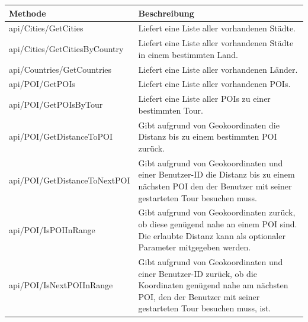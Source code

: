 \documentclass[a4paper,10pt,xetex]{article}
\begin{document}
\begin{longtabu} to \textwidth { | l | X[l] | }
\hline
\textbf{Methode} & \textbf{Beschreibung} \\
\hline
\endhead

api/Cities/GetCities &
Liefert eine Liste aller vorhandenen St\"adte.\\\hline
api/Cities/GetCitiesByCountry &
Liefert eine Liste aller vorhandenen St\"adte in einem bestimmten Land.\\\hline
  api/Countries/GetCountries &
Liefert eine Liste aller vorhandenen L\"ander.\\\hline
api/POI/GetPOIs &
Liefert eine Liste aller vorhandenen POIs.\\\hline
api/POI/GetPOIsByTour &
Liefert eine Liste aller POIs zu einer bestimmten Tour.\\\hline
api/POI/GetDistanceToPOI &
Gibt aufgrund von Geokoordinaten die Distanz bis zu einem bestimmten POI zur\"uck.\\\hline
api/POI/GetDistanceToNextPOI &
Gibt aufgrund von Geokoordinaten und einer Benutzer-ID die Distanz bis zu einem n\"achsten POI
  den der Benutzer mit seiner gestarteten Tour besuchen muss.\\\hline
api/POI/IsPOIInRange &
Gibt aufgrund von Geokoordinaten zur\"uck, ob diese gen\"ugend nahe an einem POI sind. Die
  erlaubte Distanz kann als optionaler Parameter mitgegeben werden. \\\hline
api/POI/IsNextPOIInRange &
Gibt aufgrund von Geokoordinaten und einer Benutzer-ID zur\"uck, ob die Koordinaten gen\"ugend
  nahe am n\"achsten POI, den der Benutzer mit seiner gestarteten Tour besuchen muss, ist.


\end{longtabu}
\end{document}
